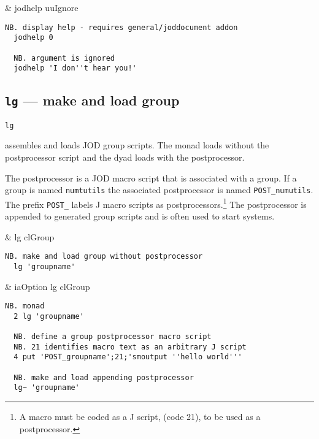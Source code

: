 \begin{wordhead}
\monad & jodhelp uuIgnore \\
\end{wordhead}
\begin{lstlisting}[frame=single,framerule=0pt] 
  NB. display help - requires general/joddocument addon
  jodhelp 0   

  NB. argument is ignored
  jodhelp 'I don''t hear you!' 
\end{lstlisting}  


\subsection{\texttt{lg} ---  make and load group}\label{ss:lg}

\hypertarget{il:lg}{\texttt{lg}} assembles 
and loads JOD group scripts.  The monad loads without the postprocessor 
script and the dyad loads with the postprocessor.

The postprocessor is a JOD macro script that is associated with a group.
If a group is named \texttt{numtutils} the associated postprocessor 
is named \verb|POST_numutils|. The prefix \verb|POST_| labels J macro scripts as postprocessors.\footnote{A macro
must be coded as a J script, (code 21), to be used as a postprocessor.
} The postprocessor is appended to generated group scripts and is often used to start systems.

\begin{wordhead}
\monad & lg clGroup \\
\end{wordhead}
\begin{lstlisting}[frame=single,framerule=0pt] 
  NB. make and load group without postprocessor 
  lg 'groupname'
\end{lstlisting}

\begin{wordhead}
\dyad & iaOption lg clGroup \\
\end{wordhead}
\begin{lstlisting}[frame=single,framerule=0pt] 
  NB. monad
  2 lg 'groupname' 

  NB. define a group postprocessor macro script
  NB. 21 identifies macro text as an arbitrary J script
  4 put 'POST_groupname';21;'smoutput ''hello world'''

  NB. make and load appending postprocessor
  lg~ 'groupname' 
\end{lstlisting}


